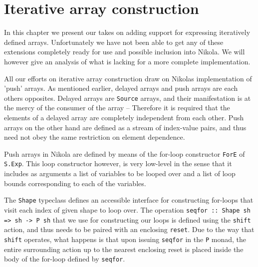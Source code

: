 \chapter{Iterative array construction}
\label{chap:unfold}



In this chapter we present our takes on adding support for expressing
iteratively defined arrays.  Unfortunately we have not been able to get any of
these extensions completely ready for use and possible inclusion into Nikola.
We will however give an analysis of what is lacking for a more complete
implementation.

All our efforts on iterative array construction draw on Nikolas implementation
of 'push' arrays. As mentioned earlier, delayed arrays and push arrays are each
others opposites. Delayed arrays are \texttt{Source} arrays, and their
manifestation is at the mercy of the consumer of the array -- Therefore it is
required that the elements of a delayed array are completely independent from
each other.  Push arrays on the other hand are defined as a stream of
index-value pairs, and thus need not obey the same restriction on element
dependence.

Push arrays in Nikola are defined by means of the for-loop constructor \texttt{ForE}
of \texttt{S.Exp}. This loop constructor however, is very low-level in the
sense that it includes as arguments a list of variables to be looped over and a
list of loop bounds corresponding to each of the variables.

The \texttt{Shape} typeclass defines an accessible interface for constructing
for-loops that visit each index of given shape to loop over.  The operation
\texttt{seqfor :: Shape sh => sh -> P sh} that we use for constructing our
loops is defined using the \texttt{shift} action, and thus needs to be paired
with an enclosing \texttt{reset}.  Due to the way that \texttt{shift} operates,
what happens is that upon issuing \texttt{seqfor} in the \texttt{P} monad, the
entire surrounding action up to the nearest enclosing reset is placed inside
the body of the for-loop defined by \texttt{seqfor}.

